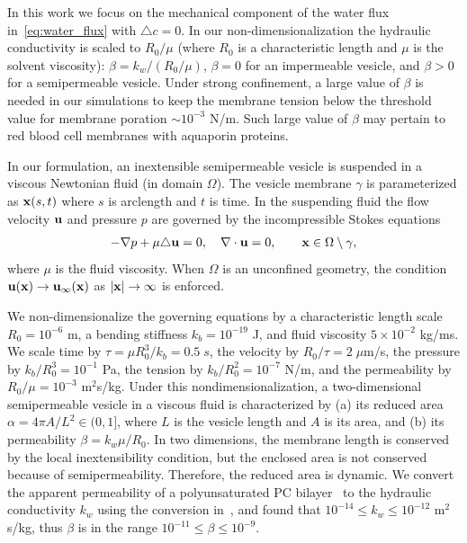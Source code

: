 \documentclass[prb,preprint,showpacs,preprintnumbers,amsmath,amssymb,longbibliography]{revtex4-1}
\begin{document}
In this work we focus on the mechanical component of the water flux
in~\eqref{eq:water_flux} with $\triangle c =0$. In our
non-dimensionalization the hydraulic conductivity is scaled to $R_0/\mu$
(where $R_0$ is a characteristic length and $\mu$ is the solvent
viscosity): $\beta = k_w/(R_0/\mu)$,
$\beta=0$ for an impermeable vesicle, and $\beta>0$ for a semipermeable
vesicle. Under strong confinement, a large value of $\beta$ is needed in
our simulations to keep the membrane tension below the threshold value
for membrane poration $\sim 10^{-3}$ N/m. Such large value of $\beta$
may pertain to red blood cell membranes with aquaporin proteins.

In our formulation, an inextensible semipermeable vesicle is suspended in a viscous Newtonian fluid 
(in domain $\Omega$).  The vesicle membrane $\gamma$ is parameterized as $\mathbf{x}(s,t)$
where $s$ is arclength and $t$ is time. In the suspending fluid the flow
velocity $\mathbf{u}$ and pressure $p$ are governed by the incompressible 
Stokes equations
\begin{align}
  \label{eqn:governing}
  -\nabla p + \mu \triangle \mathbf{u} = 0, \quad
  \nabla \cdot \mathbf{u} = 0, \qquad \mathbf{x} \in \Omega \setminus \gamma,
\end{align}
where $\mu$ is the fluid viscosity. When $\Omega$ is an unconfined
geometry, the condition $\mathbf{u}(\mathbf{x}) \rightarrow \mathbf{u}_\infty(\mathbf{x})$ as $|\mathbf{x}|
\rightarrow \infty$ is enforced. 

We non-dimensionalize the governing equations by a
characteristic length scale $R_0 = 10^{-6}$ m, a bending stiffness $k_b
= 10^{-19}$ J, and fluid viscosity $5 \times 10^{-2}$ kg/ms. We scale
time by $\tau = \mu R_0^3/k_b = 0.5\;s$, the velocity by $R_0/\tau =
2\;\mu$m/s, the pressure by $k_b/R_0^3 = 10^{-1}$ Pa, the tension by
$k_b/R_0^2 = 10^{-7}$ N/m, and the permeability by $R_0/\mu = 10^{-3}$
m$^2$s/kg. Under this nondimensionalization, a two-dimensional
semipermeable vesicle in a viscous fluid is characterized by (a) its
reduced area $\alpha = 4\pi A/L^2 \in (0,1]$, where $L$ is the vesicle
length and $A$ is its area, and (b) its permeability $\beta = k_w \mu
/R_0$. In two dimensions, the membrane length is conserved by the local
inextensibility condition, but the enclosed area is not conserved
because of semipermeability. Therefore, the reduced area is dynamic. We
convert the apparent permeability of a polyunsaturated PC
bilayer~\cite{OlbrichRawiczNeedhamEtAl2000_BJ} to the hydraulic
conductivity $k_w$ using the conversion
in~\cite{FettiplaceHaydon1980_PhysRev}, and found that $10^{-14}\le
k_w\le 10^{-12}$ m$^2$s/kg, thus $\beta$ is in the range $10^{-11}\le
\beta\le 10^{-9}$.
\end{document}
